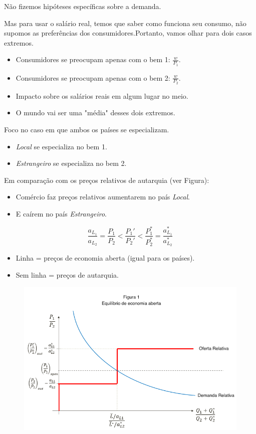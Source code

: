 \documentclass[a4paper,12pt]{article}[abntex2]
\begin{document}
Não fizemos hipóteses específicas sobre a demanda.

Mas para usar o salário real, temos que saber como funciona seu consumo, não supomos as preferências dos consumidores.Portanto, vamos olhar para dois casos extremos.\begin{itemize}
    \item Consumidores se preocupam apenas com o bem 1: \( \frac{w}{P_1} \).
    \item Consumidores se preocupam apenas com o bem 2: \( \frac{w}{P_2} \).
    \item Impacto sobre os salários reais em algum lugar no meio.
    \item O mundo vai ser uma "média" desses dois extremos. 
\end{itemize}

Foco no caso em que ambos os países se especializam.

\begin{itemize}
    \item \textit{Local} se especializa no bem 1.
    \item \textit{Estrangeiro} se especializa no bem 2.
\end{itemize}

Em comparação com os preços relativos de autarquia (ver Figura):\begin{itemize}
    \item Comércio faz preços relativos aumentarem no país \textit{Local}.
    \item E caírem no país \textit{Estrangeiro}.
\end{itemize}

\[
\frac{a_{L_1}}{a_{L_2}} = \frac{P_1}{P_2} < \frac{P_1'}{P_2'} < \frac{P_1^*}{P_2^*} = \frac{a_{L_1}^*}{a_{L_2}^*}
\]

\begin{itemize}
    \item Linha = preços de economia aberta (igual para os países).
    \item Sem linha = preços de autarquia.
\end{itemize}

\begin{figure}[H]
    \centering
    \includegraphics[width=0.7\linewidth]{Imagens/a9i1.png}
\end{figure}
\end{document}
